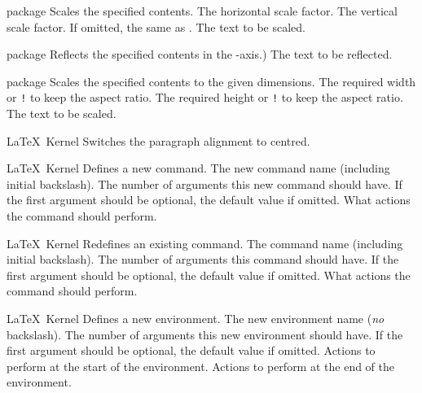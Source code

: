%
 {}%
 { package}%
 {Scales the specified contents.}%
 {%
    \BeginArgList
       The horizontal scale factor.
       The vertical scale factor. If omitted,
       the same as .
       The text to be scaled.
    \EndArgList
 }

%
 {}%
 { package}%
 {Reflects the specified contents in the -axis.)}%
 {%
    \BeginArgList
       The text to be reflected.
    \EndArgList
 }

%
 {}%
 { package}%
 {Scales the specified contents to the given dimensions.}%
 {%
   \BeginArgList
       The required width or \texttt{!} to keep
      the aspect ratio.
       The required height or \texttt{!} to keep
      the aspect ratio.
       The text to be scaled.
   \EndArgList
 }

%
 {}%
 {\LaTeX\ Kernel}%
 {Switches the paragraph alignment to centred.}%
 {}

%
 {}%
 {\LaTeX\ Kernel}%
 {Defines a new command.}%
 {%
   \BeginArgList
     The new command name (including initial backslash).
     The number of arguments this new command
     should have.
     If the first argument should be optional,
     the default value if omitted.
     What actions the command should perform.
   \EndArgList
 }

%
 {}%
 {\LaTeX\ Kernel}%
 {Redefines an existing command.}%
 {%
   \BeginArgList
     The command name (including initial backslash).
     The number of arguments this command
     should have.
     If the first argument should be optional,
     the default value if omitted.
     What actions the command should perform.
   \EndArgList
 }

%
 {}%
 {\LaTeX\ Kernel}%
 {Defines a new environment.}%
 {%
   \BeginArgList
     The new environment name (\emph{no} backslash).
     The number of arguments this new
     environment should have.
     If the first argument should be optional,
     the default value if omitted.
     Actions to perform at the start of the
      environment.
     Actions to perform at the end of the
      environment.
   \EndArgList
 }


